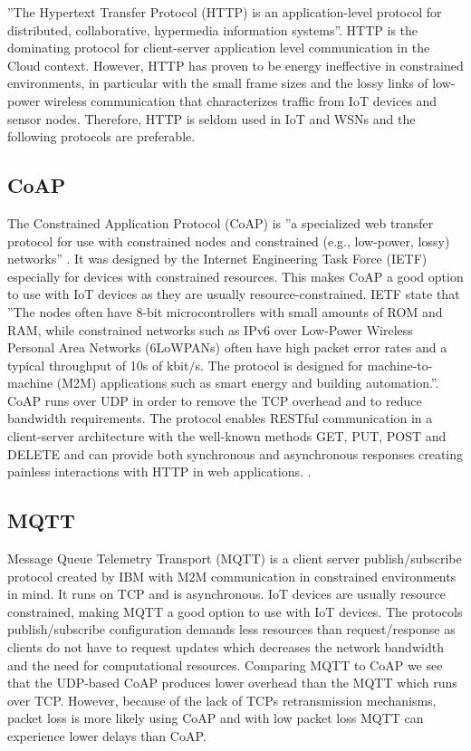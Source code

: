 \documentclass[]{uiophd}
\begin{document}
''The Hypertext Transfer Protocol (HTTP) is an application-level protocol for distributed, collaborative, hypermedia information systems''\cite{HTTP1996}. HTTP is the dominating protocol for client-server application level communication in the Cloud context. However, HTTP has proven to be energy ineffective in constrained environments, in particular with the small frame sizes and the lossy links of low-power wireless communication that characterizes traffic from IoT devices and sensor nodes\cite{karagiannis2015survey}\cite{7030106}. Therefore, HTTP is seldom used in IoT and WSNs and the following protocols are preferable.

\subsection{CoAP}
The Constrained Application Protocol (CoAP) is ''a specialized web transfer protocol for use with constrained nodes and constrained (e.g., low-power, lossy) networks'' \cite{rfc7252}. It was designed by the Internet Engineering Task Force (IETF) especially for devices with constrained resources. This makes CoAP a good option to use with IoT devices as they are usually resource-constrained. IETF state that ''The nodes often have 8-bit microcontrollers with small amounts of ROM and RAM, while constrained networks such as IPv6 over Low-Power Wireless Personal Area Networks (6LoWPANs) often have high packet error rates and a typical throughput of 10s of kbit/s.  The protocol is designed for machine-to-machine (M2M) applications such as smart energy and building automation.''\cite{rfc7252}. CoAP runs over UDP in order to remove the TCP overhead and to reduce bandwidth requirements. The protocol enables RESTful communication in a client-server architecture with the well-known methods GET, PUT, POST and DELETE and can provide both synchronous and asynchronous responses creating painless interactions with HTTP in web applications.
\cite{rfc7252}
\cite{karagiannis2015survey}
\cite{7030106}.

\subsection{MQTT}
Message Queue Telemetry Transport (MQTT) is a client server publish/subscribe protocol created by IBM with M2M communication in constrained environments in mind. It runs on TCP and is asynchronous. IoT devices are usually resource constrained, making MQTT a good option to use with IoT devices. The protocols publish/subscribe configuration demands less resources than request/response as clients do not have to request updates which decreases the network bandwidth and the need for computational resources. Comparing MQTT to CoAP we see that the UDP-based CoAP produces lower overhead than the MQTT which runs over TCP. However, because of the lack of TCPs retransmission mechanisms, packet loss is more likely using CoAP and with low packet loss MQTT can experience lower delays than CoAP\cite{karagiannis2015survey}.
\end{document}
